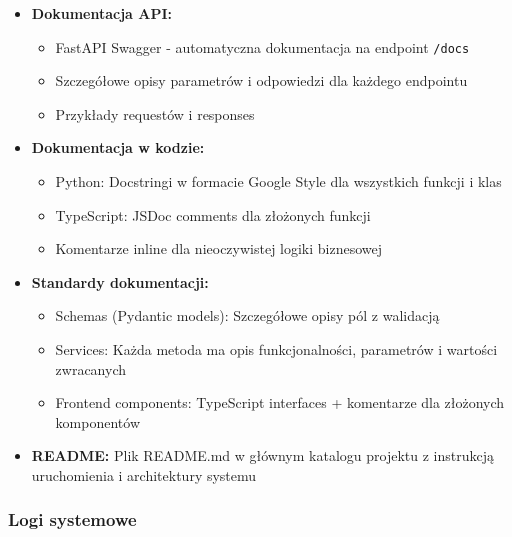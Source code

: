 \documentclass[12pt,a4paper]{article}
\begin{document}
\begin{itemize}[leftmargin=*]
    \item \textbf{Dokumentacja API:}
    \begin{itemize}
        \item FastAPI Swagger - automatyczna dokumentacja na endpoint \texttt{/docs}
        \item Szczegółowe opisy parametrów i odpowiedzi dla każdego endpointu
        \item Przykłady requestów i responses
    \end{itemize}
    \item \textbf{Dokumentacja w kodzie:}
    \begin{itemize}
        \item Python: Docstringi w formacie Google Style dla wszystkich funkcji i klas
        \item TypeScript: JSDoc comments dla złożonych funkcji
        \item Komentarze inline dla nieoczywistej logiki biznesowej
    \end{itemize}
    \item \textbf{Standardy dokumentacji:}
    \begin{itemize}
        \item Schemas (Pydantic models): Szczegółowe opisy pól z walidacją
        \item Services: Każda metoda ma opis funkcjonalności, parametrów i wartości zwracanych
        \item Frontend components: TypeScript interfaces + komentarze dla złożonych komponentów
    \end{itemize}
    \item \textbf{README:} Plik README.md w głównym katalogu projektu z instrukcją uruchomienia i architektury systemu
\end{itemize}

\subsubsection{Logi systemowe}
\end{document}
